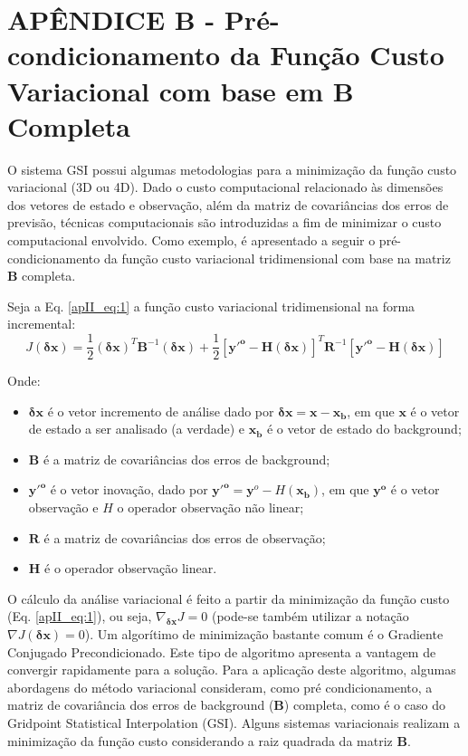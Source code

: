 
\chapter{APÊNDICE B - Pré-condicionamento da Função Custo Variacional com base em $\mathbf{B}$ Completa}
\label{apendiceII}

O sistema GSI possui algumas metodologias para a minimização da função custo variacional (3D ou 4D). Dado o custo computacional relacionado às dimensões dos vetores de estado e observação, além da matriz de covariâncias dos erros de previsão, técnicas computacionais são introduzidas a fim de minimizar o custo computacional envolvido. Como exemplo, é apresentado a seguir o pré-condicionamento da função custo variacional tridimensional com base na matriz $\mathbf{B}$ completa.

Seja a Eq. \ref{apII_eq:1} a função custo variacional tridimensional na forma incremental:
\begin{equation}
\label{apII_eq:1}
  J(\mathbf{\delta{x}}) = \frac{1}{2}(\mathbf{\delta{x}})^{T}\mathbf{B}^{-1}(\mathbf{\delta{x}}) + \frac{1}{2}[\mathbf{y'^o} - \mathbf{H}(\mathbf{\delta{x}})]^{T}\mathbf{R}^{-1}[\mathbf{y'^o} - \mathbf{H}(\mathbf{\delta{x}})]
\end{equation}

Onde:

\begin{itemize}
  \item $\mathbf{\delta{x}}$ é o vetor incremento de análise dado por $\mathbf{\delta{x}} = \mathbf{x} - \mathbf{x_b}$, em que $\mathbf{x}$ é o vetor de estado a ser analisado (a verdade) e $\mathbf{x_b}$ é o vetor de estado do background;
  \item $\mathbf{B}$ é a matriz de covariâncias dos erros de background;
  \item $\mathbf{y'^{o}}$ é o vetor inovação, dado por $\mathbf{y'^o}=\mathbf{y}^o - \textit{H}(\mathbf{x_b})$, em que $\mathbf{y^o}$ é o vetor observação e $\textit{H}$ o operador observação não linear;
  \item $\mathbf{R}$ é a matriz de covariâncias dos erros de observação;
  \item $\mathbf{H}$ é o operador observação linear.
\end{itemize}

O cálculo da análise variacional é feito a partir da minimização da função custo (Eq. \ref{apII_eq:1}), ou seja, $\nabla_{\mathbf{\delta{x}}}J=0$ (pode-se também utilizar a notação $\nabla{J(\mathbf{\delta{x}})}=0$). Um algorítimo de minimização bastante comum é o Gradiente Conjugado Precondicionado. Este tipo de algoritmo apresenta a vantagem de convergir rapidamente para a solução. Para a aplicação deste algoritmo, algumas abordagens do método variacional consideram, como pré condicionamento, a matriz de covariância dos erros de background ($\mathbf{B}$) completa, como é o caso do Gridpoint Statistical Interpolation (GSI). Alguns sistemas variacionais realizam a minimização da função custo considerando a raiz quadrada da matriz $\mathbf{B}$.

